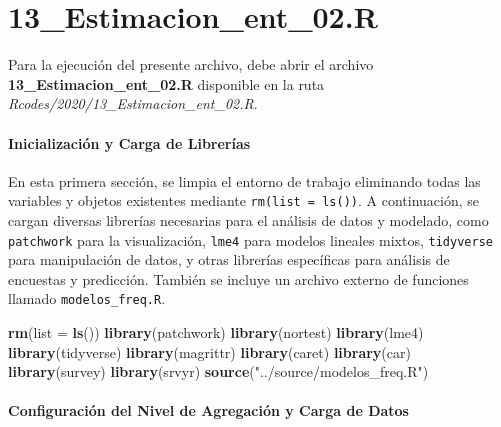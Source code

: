 \documentclass[
  12pt,
]{book}
\newenvironment{Shaded}{\begin{snugshade}}{\end{snugshade}}
\newcommand{\AttributeTok}[1]{\textcolor[rgb]{0.13,0.29,0.53}{#1}}
\newcommand{\FunctionTok}[1]{\textcolor[rgb]{0.13,0.29,0.53}{\textbf{#1}}}
\newcommand{\NormalTok}[1]{#1}
\newcommand{\StringTok}[1]{\textcolor[rgb]{0.31,0.60,0.02}{#1}}
\begin{document}
\hypertarget{estimacion_ent_02.r}{%
\chapter*{13\_Estimacion\_ent\_02.R}\label{estimacion_ent_02.r}}

Para la ejecución del presente archivo, debe abrir el archivo \textbf{13\_Estimacion\_ent\_02.R} disponible en la ruta \emph{Rcodes/2020/13\_Estimacion\_ent\_02.R}.

\hypertarget{inicializaciuxf3n-y-carga-de-libreruxedas}{%
\subsubsection*{Inicialización y Carga de Librerías}\label{inicializaciuxf3n-y-carga-de-libreruxedas}}

En esta primera sección, se limpia el entorno de trabajo eliminando todas las variables y objetos existentes mediante \texttt{rm(list\ =\ ls())}. A continuación, se cargan diversas librerías necesarias para el análisis de datos y modelado, como \texttt{patchwork} para la visualización, \texttt{lme4} para modelos lineales mixtos, \texttt{tidyverse} para manipulación de datos, y otras librerías específicas para análisis de encuestas y predicción. También se incluye un archivo externo de funciones llamado \texttt{modelos\_freq.R}.

\begin{Shaded}
\begin{Highlighting}[]
\FunctionTok{rm}\NormalTok{(}\AttributeTok{list =} \FunctionTok{ls}\NormalTok{())}
\FunctionTok{library}\NormalTok{(patchwork)}
\FunctionTok{library}\NormalTok{(nortest)}
\FunctionTok{library}\NormalTok{(lme4)}
\FunctionTok{library}\NormalTok{(tidyverse)}
\FunctionTok{library}\NormalTok{(magrittr)}
\FunctionTok{library}\NormalTok{(caret)}
\FunctionTok{library}\NormalTok{(car)}
\FunctionTok{library}\NormalTok{(survey)}
\FunctionTok{library}\NormalTok{(srvyr)}
\FunctionTok{source}\NormalTok{(}\StringTok{"../source/modelos\_freq.R"}\NormalTok{)}
\end{Highlighting}
\end{Shaded}

\hypertarget{configuraciuxf3n-del-nivel-de-agregaciuxf3n-y-carga-de-datos}{%
\subsubsection*{Configuración del Nivel de Agregación y Carga de Datos}\label{configuraciuxf3n-del-nivel-de-agregaciuxf3n-y-carga-de-datos}}
\end{document}
